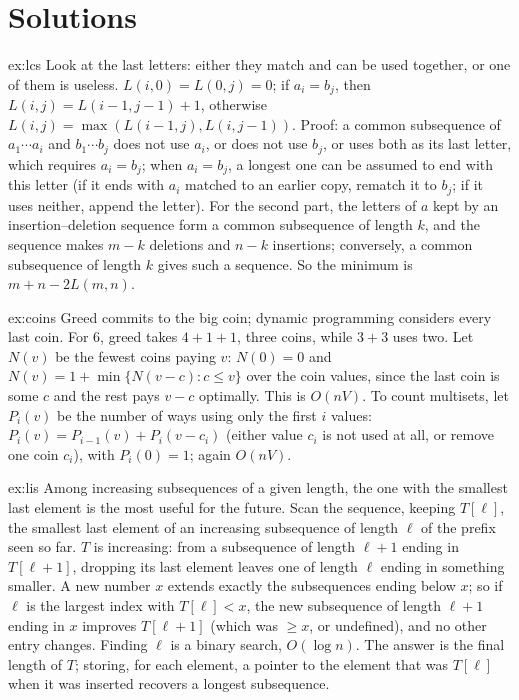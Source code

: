 \section{Solutions}

\begin{solution}{ex:lcs}
\idea Look at the last letters: either they match and can be used together, or one of them is useless.
\writeup $L(i,0)=L(0,j)=0$; if $a_i=b_j$, then $L(i,j)=L(i-1,j-1)+1$, otherwise $L(i,j)=\max(L(i-1,j),L(i,j-1))$. Proof: a common subsequence of $a_1\cdots a_i$ and $b_1\cdots b_j$ does not use $a_i$, or does not use $b_j$, or uses both as its
last letter, which requires $a_i=b_j$; when $a_i=b_j$, a longest one can be assumed to end with this letter (if it ends with $a_i$ matched to an earlier copy, rematch it to $b_j$; if it uses neither, append the letter). For the second part, the letters of $a$ kept by an
insertion--deletion sequence form a common subsequence of length $k$, and the sequence makes $m-k$ deletions and $n-k$ insertions; conversely, a common subsequence of length $k$ gives such a sequence. So the minimum is $m+n-2L(m,n)$.
\end{solution}

\begin{solution}{ex:coins}
\idea Greed commits to the big coin; dynamic programming considers every last coin.
\writeup For $6$, greed takes $4+1+1$, three coins, while $3+3$ uses two. Let $N(v)$ be the fewest coins paying $v$: $N(0)=0$ and $N(v)=1+\min\{N(v-c): c\le v\}$ over the coin values, since the last coin is some $c$ and the rest pays $v-c$ optimally. This is $O(nV)$. To count
multisets, let $P_i(v)$ be the number of ways using only the first $i$ values: $P_i(v)=P_{i-1}(v)+P_i(v-c_i)$ (either value $c_i$ is not used at all, or remove one coin $c_i$), with $P_i(0)=1$; again $O(nV)$.
\end{solution}

\begin{solution}{ex:lis}
\idea Among increasing subsequences of a given length, the one with the smallest last element is the most useful for the future.
\writeup Scan the sequence, keeping $T[\ell]$, the smallest last element of an increasing subsequence of length $\ell$ of the prefix seen so far. $T$ is increasing: from a subsequence of length $\ell+1$ ending in $T[\ell+1]$, dropping its last element leaves one of length
$\ell$ ending in something smaller. A new number $x$ extends exactly the subsequences ending below $x$; so if $\ell$ is the largest index with $T[\ell]<x$, the new subsequence of length $\ell+1$ ending in $x$ improves $T[\ell+1]$ (which was $\ge x$, or undefined), and no other entry
changes. Finding $\ell$ is a binary search, $O(\log n)$. The answer is the final length of $T$; storing, for each element, a pointer to the element that was $T[\ell]$ when it was inserted recovers a longest subsequence.
\end{solution}

